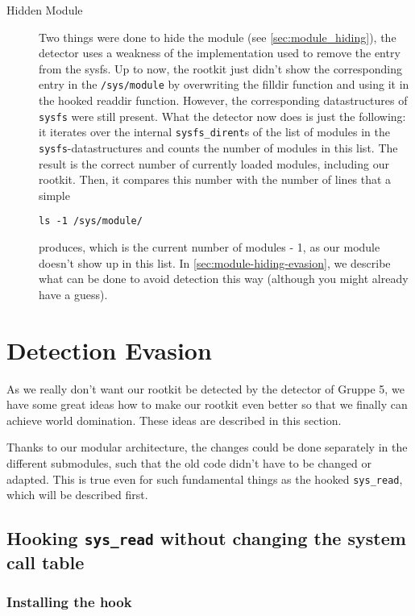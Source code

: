 \documentclass[10pt, letterpaper]{scrartcl}
\begin{document}
\begin{description}
\item[Hidden Module] Two things were done to hide the module (see \autoref{sec:module_hiding}), the detector uses a weakness of the implementation used to remove the entry from the sysfs. Up to now, the rootkit just didn't show the corresponding entry in the \texttt{/sys/module} by overwriting the filldir function and using it in the hooked readdir function. However, the corresponding datastructures of \texttt{sysfs} were still present. What the detector now does is just the following: it iterates over the internal \texttt{sysfs\_dirent}s of the list of modules in the \texttt{sysfs}-datastructures and counts the number of modules in this list. The result is the correct number of currently loaded modules, including our rootkit. Then, it compares this number with the number of lines that a simple 
\begin{verbatim}
ls -1 /sys/module/
\end{verbatim}
produces, which is the current number of modules - 1, as our module doesn't show up in this list. In \autoref{sec:module-hiding-evasion}, we describe what can be done to avoid detection this way (although you might already have a guess).

\end{description}

\section{Detection Evasion}
\label{sec:detection-evasion}
As we really don't want our rootkit be detected by the detector of Gruppe 5, we have some great ideas how to make our rootkit even better so that we finally can achieve world domination. These ideas are described in this section.

Thanks to our modular architecture, the changes could be done separately in the different submodules, such that the old code didn't have to be changed or adapted. This is true even for such fundamental things as the hooked \texttt{sys\_read}, which will be described first.

\subsection{Hooking \texttt{sys\_read} without changing the system call table}
\label{sec:hooking-read-2}

\subsubsection{Installing the hook}
\label{sec:hooking-read-install-hook}
\end{document}
